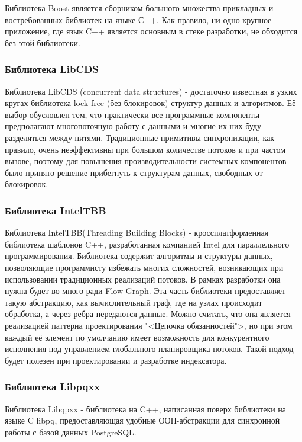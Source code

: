 Библиотека Boost является сборником большого множества прикладных и востребованных библиотек на языке С++. Как правило, ни одно крупное приложение, где язык C++ является основным в стеке разработки, не обходится без этой библиотеки.
 
\subsubsection{Библиотека LibCDS}

Библиотека LibCDS (concurrent data structures) - достаточно известная в узких кругах библиотека lock-free (без блокировок) структур данных и алгоритмов. Её выбор обусловлен тем, что практически все программные компоненты предполагают многопоточную работу с данными и многие их них буду разделяться между нитями. Традиционные примитивы синхронизации, как правило, очень неэффективны при большом количестве потоков и при частом вызове, поэтому для повышения производительности системных компонентов было принято решение прибегнуть к структурам данных, свободных от блокировок.

\subsubsection{Библиотека IntelTBB}

Библиотека IntelTBB(Threading Building Blocks) - кроссплатформенная библиотека шаблонов C++, разработанная компанией Intel для параллельного программирования. Библиотека содержит алгоритмы и структуры данных, позволяющие программисту избежать многих сложностей, возникающих при использовании традиционных реализаций потоков. В рамках разработки она нужна будет во много ради Flow Graph. Эта часть библиотеки предоставляет такую абстракцию, как вычислительный граф, где на узлах происходит обработка, а через ребра передаются данные. Можно считать, что она является реализацией паттерна проектирования "<Цепочка обязанностей">, но при этом каждый её элемент по умолчанию имеет возможность для конкурентного исполнения под управлением глобального планировщика потоков. Такой подход будет полезен при проектировании и разработке индексатора.

\subsubsection{Библиотека Libpqxx}

Библиотека Libqpxx - библиотека на C++, написанная поверх библиотеки на языке C libpq, предоставляющая удобные ООП-абстракции для синхронной работы с базой данных PostgreSQL.

